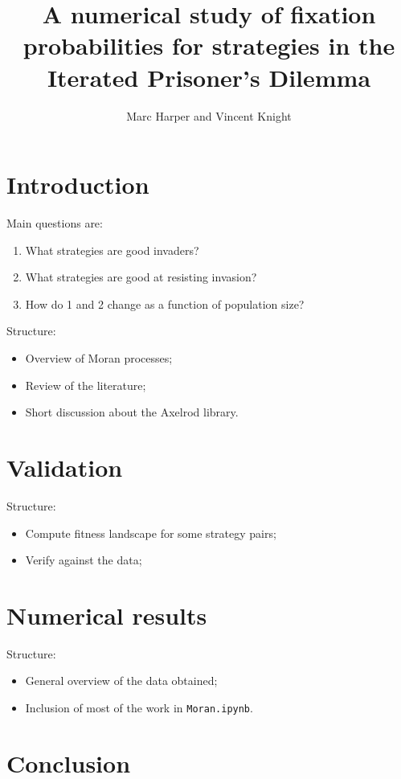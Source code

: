 \documentclass{article}
\title{A numerical study of fixation probabilities for strategies in the
Iterated Prisoner's Dilemma}
\author{Marc Harper and Vincent Knight}
\date{}
\begin{document}
\maketitle


\section{Introduction}\label{sec:introduction}

Main questions are:

\begin{enumerate}
    \item What strategies are good invaders?
    \item What strategies are good at resisting invasion?
    \item How do 1 and 2 change as a function of population size?
\end{enumerate}

Structure:

\begin{itemize}
    \item Overview of Moran processes;
    \item Review of the literature;
    \item Short discussion about the Axelrod library.
\end{itemize}

\section{Validation}\label{sec:validation}

Structure:

\begin{itemize}
    \item Compute fitness landscape for some strategy pairs;
    \item Verify against the data;
\end{itemize}

\section{Numerical results}\label{sec:numerical_results}

Structure:

\begin{itemize}
    \item General overview of the data obtained;
    \item Inclusion of most of the work in \texttt{Moran.ipynb}.
\end{itemize}

\section{Conclusion}\label{sec:conclusion}
\end{document}
